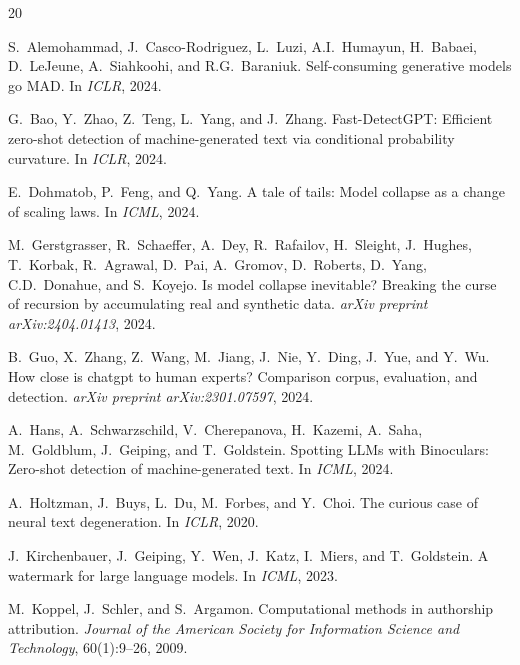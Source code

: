 \documentclass[11pt,a4paper]{article}
\begin{document}
\begin{thebibliography}{20}

S.~Alemohammad, J.~Casco-Rodriguez, L.~Luzi, A.I.~Humayun, H.~Babaei, D.~LeJeune, A.~Siahkoohi, and R.G.~Baraniuk.
\newblock Self-consuming generative models go {MAD}.
\newblock In \emph{ICLR}, 2024.

G.~Bao, Y.~Zhao, Z.~Teng, L.~Yang, and J.~Zhang.
\newblock Fast-{D}etect{GPT}: Efficient zero-shot detection of machine-generated text via conditional probability curvature.
\newblock In \emph{ICLR}, 2024.

E.~Dohmatob, P.~Feng, and Q.~Yang.
\newblock A tale of tails: Model collapse as a change of scaling laws.
\newblock In \emph{ICML}, 2024.

M.~Gerstgrasser, R.~Schaeffer, A.~Dey, R.~Rafailov, H.~Sleight, J.~Hughes, T.~Korbak, R.~Agrawal, D.~Pai, A.~Gromov, D.~Roberts, D.~Yang, C.D.~Donahue, and S.~Koyejo.
\newblock Is model collapse inevitable? {B}reaking the curse of recursion by accumulating real and synthetic data.
\newblock \emph{arXiv preprint arXiv:2404.01413}, 2024.

B.~Guo, X.~Zhang, Z.~Wang, M.~Jiang, J.~Nie, Y.~Ding, J.~Yue, and Y.~Wu.
\newblock How close is chatgpt to human experts? {C}omparison corpus, evaluation, and detection.
\newblock \emph{arXiv preprint arXiv:2301.07597}, 2024.

A.~Hans, A.~Schwarzschild, V.~Cherepanova, H.~Kazemi, A.~Saha, M.~Goldblum, J.~Geiping, and T.~Goldstein.
\newblock Spotting {LLMs} with {B}inoculars: Zero-shot detection of machine-generated text.
\newblock In \emph{ICML}, 2024.

A.~Holtzman, J.~Buys, L.~Du, M.~Forbes, and Y.~Choi.
\newblock The curious case of neural text degeneration.
\newblock In \emph{ICLR}, 2020.

J.~Kirchenbauer, J.~Geiping, Y.~Wen, J.~Katz, I.~Miers, and T.~Goldstein.
\newblock A watermark for large language models.
\newblock In \emph{ICML}, 2023.

M.~Koppel, J.~Schler, and S.~Argamon.
\newblock Computational methods in authorship attribution.
\newblock \emph{Journal of the American Society for Information Science and Technology}, 60(1):9--26, 2009.


\end{thebibliography}
\end{document}
